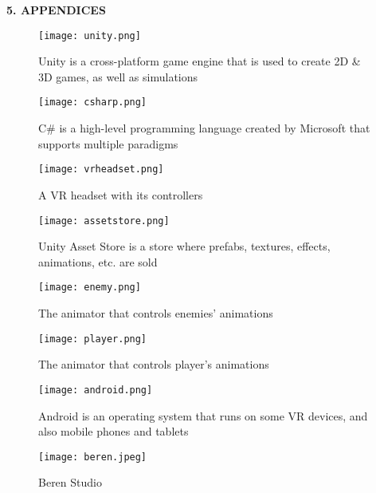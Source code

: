 \documentclass[a4paper]{article}
\begin{document}
\newpage

\noindent
\textbf{5. APPENDICES}\\

\begin{figure}[h]
\centering
\texttt{[image: unity.png]} 
\caption{Unity is a cross-platform game engine that is used to create 2D \& 3D games, as well as simulations}
\end{figure}

\begin{figure}[h]
\centering
\texttt{[image: csharp.png]} 
\caption{C\# is a high-level programming language created by Microsoft that supports multiple paradigms}
\end{figure}

\begin{figure}[h]
\centering
\texttt{[image: vrheadset.png]} 
\caption{A VR headset with its controllers}
\end{figure}

\vspace{10cm}

\begin{figure}[h]
\centering
\texttt{[image: assetstore.png]} 
\caption{Unity Asset Store is a store where prefabs, textures, effects, animations, etc. are sold}
\end{figure}

\vspace{20cm}

\begin{figure}[h]
\centering
\texttt{[image: enemy.png]} 
\caption{The animator that controls enemies' animations}
\end{figure}

\vspace{5cm}

\begin{figure}[h]
\centering
\texttt{[image: player.png]} 
\caption{The animator that controls player's animations}
\end{figure}

\begin{figure}[h]
\centering
\texttt{[image: android.png]} 
\caption{Android is an operating system that runs on some VR devices, and also mobile phones and tablets}
\end{figure}

\vspace{25cm}

\begin{figure}[h]
\centering
\texttt{[image: beren.jpeg]} 
\caption{Beren Studio}
\end{figure}
\end{document}
